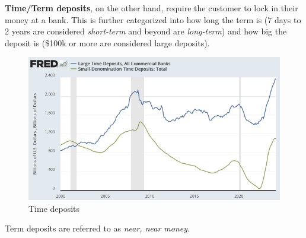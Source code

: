 \documentclass{article}
\begin{document}
    \begin{definition}
      \textbf{Time/Term deposits}, on the other hand, require the customer to lock in their money at a bank. This is further categorized into how long the term is (7 days to 2 years are considered \textit{short-term} and beyond are \textit{long-term}) and how big the deposit is (\$100k or more are considered large deposits). 
      \begin{figure}[H]
        \centering 
        \includegraphics[scale=0.4]{img/time_deposits.png}
        \caption{Time deposits} 
        \label{fig:time_deposit}
      \end{figure}
    \end{definition}

    Term deposits are referred to as \textit{near, near money}. 
\end{document}
